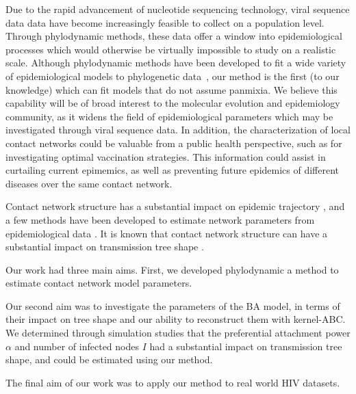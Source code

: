 Due to the rapid advancement of nucleotide sequencing technology, viral
sequence data data have become increasingly feasible to collect on a population
level. Through phylodynamic methods, these data offer a window into
epidemiological processes which would otherwise be virtually impossible to
study on a realistic scale. Although phylodynamic methods have been developed
to fit a wide variety of epidemiological models to phylogenetic
data~\autocite{volz2012complex, rasmussen2014phylodynamic}, our method is the
first (to our knowledge) which can fit models that do not assume panmixia. We
believe this capability will be of broad interest to the molecular evolution
and epidemiology community, as it widens the field of epidemiological
parameters which may be investigated through viral sequence data. In addition,
the characterization of local contact networks could be valuable from a public
health perspective, such as for investigating optimal vaccination strategies.
This information could assist in curtailing current epimemics, as well as
preventing future epidemics of different diseases over the same contact
network.

Contact network structure has a substantial impact on epidemic trajectory
\autocite{barthelemy2005dynamical, volz2007susceptible, volz2008sir}, and a few
methods have been developed to estimate network parameters from epidemiological
data \autocite{volz2007susceptible, britton2002bayesian,
groendyke2011bayesian}. It is known that contact network structure can have a
substantial impact on transmission tree shape \autocite{o2010contact,
robinson2013dynamics, leventhal2012inferring, colijn2014phylogenetic,
villandre2016assessment}.

Our work had three main aims. First, we developed phylodynamic a method to
estimate contact network model parameters. 


Our second aim was to investigate the parameters of the \gls{BA} model, in
terms of their impact on tree shape and our ability to reconstruct them with
kernel-\gls{ABC}. We determined through simulation studies that the
preferential attachment power $\alpha$ and number of infected nodes $I$ had a
substantial impact on transmission tree shape, and could be estimated using our
method.


The final aim of our work was to apply our method to real world
\gls{HIV} datasets. 


